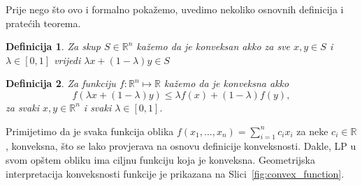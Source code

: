 \documentclass[a4paper, utf8, 11pt, colorlinks]{book}
\newtheorem{definition}{Definicija}[chapter]
\theoremstyle{definition}
\begin{document}
Prije nego što ovo i formalno pokažemo, uvedimo nekoliko osnovnih definicija i pratećih teorema. 

\begin{definition}
  Za skup $S \in \mathbb{R}^n$ kažemo da je konveksan akko za sve $x,y\in S$ i $\lambda\in [0, 1]$ vrijedi $\lambda x + (1 - \lambda)y \in S$
\end{definition}
\begin{definition}
   Za funkciju $f:\mathbb{R}^n \mapsto \mathbb{R}$ kažemo da je konveksna akko 
   $$ f( \lambda x + (1-\lambda) y) \leq \lambda f(x) + (1 -\lambda) f(y),$$
   za svaki $x,y \in \mathbb{R}^n$ i svaki $\lambda \in [0,1].$
\end{definition}
Primijetimo da je svaka funkcija oblika $f(x_1, \ldots, x_n) = \sum_{i=1}^n c_i x_i$ za neke $c_i \in \mathbb{R}$, konveksna, što se lako provjerava na osnovu definicije konveksnosti. Dakle, LP u svom opštem obliku  ima ciljnu funkciju koja je konveksna. Geometrijska interpretacija konveksnosti funkcije je prikazana na Slici~\ref{fig:convex_function}.
\end{document}
